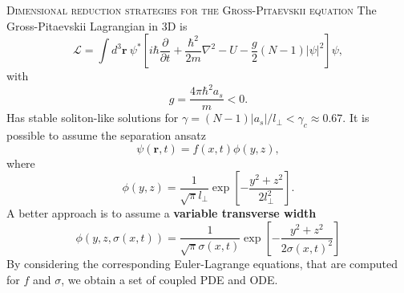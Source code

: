 \documentclass[final]{beamer}
\newlength{\colwidth}
\begin{document}
\begin{frame}[t]
\begin{columns}[t]
\begin{column}{\colwidth}
\begin{block}{\textsc{Dimensional reduction strategies for the Gross-Pitaevskii equation}}{}
        The Gross-Pitaevskii Lagrangian in 3D is 
        \begin{equation}\label{eq:3dlagrangian}
        \mathcal{L}= \int d^3 \mathbf{r} \ \psi^* \left[i \hbar \frac{\partial}{\partial t}+\frac{\hbar^2}{2 m} \nabla^2-U-\frac{g}{2}(N-1)|\psi|^2 \right] \psi,
        \end{equation}
        with   
        \begin{equation}
          g = \frac{4\pi \hbar^2 a_s}{m}<0.
        \end{equation}
        Has stable soliton-like solutions for $\gamma = (N-1) |a_s|/l_\perp<\gamma_c \approx 0.67$.
        It is possible to assume the separation ansatz
        \begin{equation}\label{eq:1dansats}
          \psi(\mathbf{r}, t) = f(x, t) \phi(y, z),
        \end{equation}
        where
        \begin{equation}
            \phi(y, z) = \dfrac{1}{\sqrt{\pi} l_\perp} \exp\left[-\frac{y^2+z^2}{2l_\perp^2}\right].
        \end{equation}
        A better approach is to assume a \textbf{variable transverse width} 
        \begin{equation}\label{eq:npseansatz}
            \phi(y, z, \sigma(x, t)) = \dfrac{1}{\sqrt{\pi} \sigma(x, t)} \exp\left[-\frac{y^2+z^2}{2\sigma(x, t)^2}\right]
        \end{equation}
        By considering the corresponding Euler-Lagrange equations, that are computed for $f$ and $\sigma$, we obtain a set of coupled PDE and ODE.
      \end{block}


\end{column}
\end{columns}
\end{frame}
\end{document}
